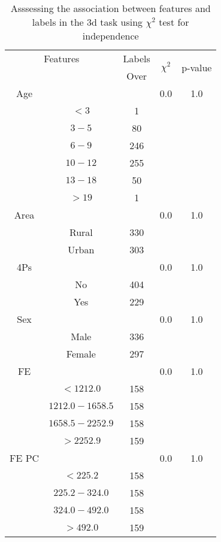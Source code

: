 \begin{table}[!htb]
\centering
\caption{Asssessing the association between features and labels in the 3d task using $\chi^2$ test for independence}
\label{tab:chitest_3d}
\begin{tabular}{c c | c| c | c}
\hline
\multicolumn{2}{c|}{Features}& \multicolumn{1}{c|}{Labels}& \multirow{2}{*}{$\chi^2$} & \multirow{2}{*}{p-value}\\ 
& & Over & & \\ 
\hline
Age &  & & 0.0 & 1.0 \\ 
& $< 3$ & 1& & \\ 
& $3-5$ & 80& & \\ 
& $6-9$ & 246& & \\ 
& $10-12$ & 255& & \\ 
& $13-18$ & 50& & \\ 
& $> 19$ & 1& & \\ 
\hline 
Area &  & & 0.0 & 1.0 \\ 
& Rural & 330& & \\ 
& Urban & 303& & \\ 
\hline 
4Ps &  & & 0.0 & 1.0 \\ 
& No & 404& & \\ 
& Yes & 229& & \\ 
\hline 
Sex &  & & 0.0 & 1.0 \\ 
& Male & 336& & \\ 
& Female & 297& & \\ 
\hline 
FE &  & & 0.0 & 1.0 \\ 
& $< 1212.0$ & 158& & \\ 
& $1212.0-1658.5$ & 158& & \\ 
& $1658.5-2252.9$ & 158& & \\ 
& $> 2252.9$ & 159& & \\ 
\hline 
FE PC &  & & 0.0 & 1.0 \\ 
& $< 225.2$ & 158& & \\ 
& $225.2-324.0$ & 158& & \\ 
& $324.0-492.0$ & 158& & \\ 
& $> 492.0$ & 159& & \\ 
\hline 
\end{tabular}
\end{table}
